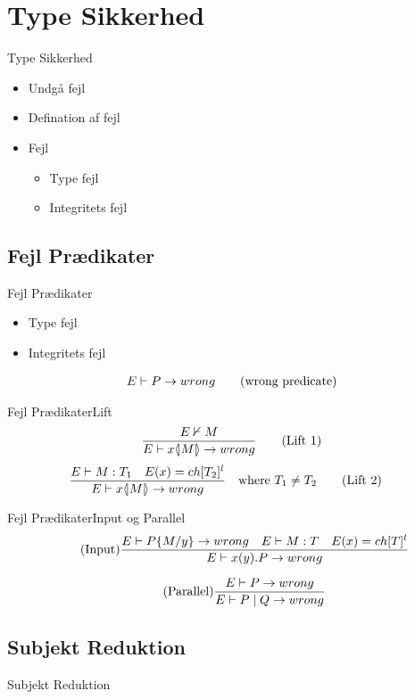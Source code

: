 \section{Type Sikkerhed}
\begin{frame}{Type Sikkerhed}
\begin{itemize}
\item Undgå fejl
\item Defination af fejl
\item Fejl 	\begin{itemize}
				\item Type fejl
				\item Integritets fejl
			\end{itemize}

\end{itemize}
\end{frame}

\subsection{Fejl Prædikater}
\begin{frame}{Fejl Prædikater}
\begin{itemize}
	\item Type fejl
	\item Integritets fejl
\end{itemize}
\begin{align}
	E \vdash P \rightarrow wrong \tag{wrong predicate}
\end{align}
\end{frame}

\begin{frame}{Fejl Prædikater}{Lift}
\begin{align}
	\frac{E \nvdash M}{E \vdash x \langle \! | M | \! \rangle \rightarrow wrong} \tag{Lift 1}
\end{align}	
\begin{align}
	\frac{E \vdash M:T_1 \quad E(x)=ch[T_2]^l}{E \vdash x \langle \! | M | \! \rangle \rightarrow wrong} &\quad \text{where}\ T_1 \neq T_2\tag{Lift 2}
\end{align}
\end{frame}

\begin{frame}{Fejl Prædikater}{Input og Parallel}
\begin{align}
	\tag{Input}\frac{E \vdash P\{ M/ y\} \rightarrow wrong \quad E \vdash M:T \quad E(x)= ch[T]^l} {E \vdash x(y).P \rightarrow wrong}
\end{align}	

\begin{align}
	\tag{Parallel}\frac{E \vdash P \rightarrow wrong}{E \vdash P \mid Q \rightarrow wrong}
\end{align}
\end{frame}


\subsection{Subjekt Reduktion}
\begin{frame}{Subjekt Reduktion}

\end{frame}